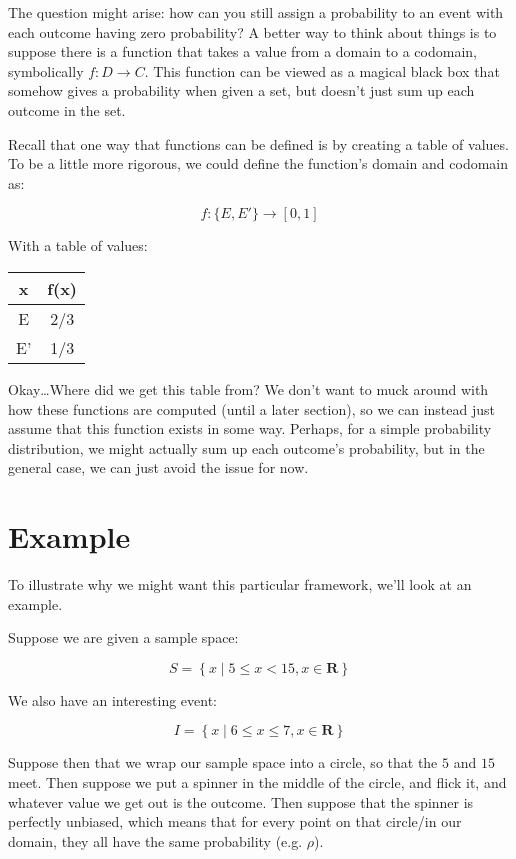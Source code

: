 \documentclass{article}
\begin{document}
The question might arise: how can you still assign a probability to an
event with each outcome having zero probability? A better way to think
about things is to suppose there is a function that takes a value from
a domain to a codomain, symbolically $f: D\rightarrow C$. This
function can be viewed as a magical black box that somehow gives a
probability when given a set, but doesn't just sum up each outcome in
the set.

Recall that one way that functions can be defined is by creating a
table of values. To be a little more rigorous, we could define the
function's domain and codomain as:

\[
f: \{E, E'\} \rightarrow [0, 1]
\]

With a table of values:

\begin{tabular}{c|c}
x & f(x) \\
\hline
E & 2/3 \\
E' & 1/3
\end{tabular}

Okay\ldots Where did we get this table from? We don't want to muck
around with how these functions are computed (until a later section),
so we can instead just assume that this function exists in some
way. Perhaps, for a simple probability distribution, we might actually
sum up each outcome's probability, but in the general case, we can
just avoid the issue for now.

\section*{Example}

To illustrate why we might want this particular framework, we'll look
at an example.

Suppose we are given a sample space:

\[
S = \left\{ x \mid 5 \le x < 15, x \in \mathbf{R} \right\}
\]

We also have an interesting event:

\[
I = \left\{x \mid 6 \le x \le 7, x \in \mathbf{R} \right\}
\]

Suppose then that we wrap our sample space into a circle, so that the
$5$ and $15$ meet. Then suppose we put a spinner in the middle of the
circle, and flick it, and whatever value we get out is the
outcome. Then suppose that the spinner is perfectly unbiased, which
means that for every point on that circle/in our domain, they all have
the same probability (e.g. $\rho$).
\end{document}
